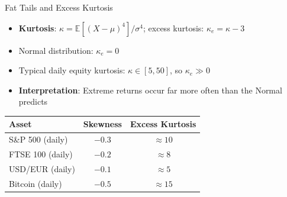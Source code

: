 \documentclass[9pt, aspectratio=169, t]{beamer}
\theoremstyle{definition}
\newcommand{\E}{\mathbb{E}}
\begin{document}
\begin{frame}{Fat Tails and Excess Kurtosis}
\begin{itemize}
\item \textbf{Kurtosis}: $\kappa = \E[(X-\mu)^4]/\sigma^4$; \quad excess kurtosis: $\kappa_e = \kappa - 3$
\item Normal distribution: $\kappa_e = 0$
\item Typical daily equity kurtosis: $\kappa \in [5, 50]$, so $\kappa_e \gg 0$
\item \textbf{Interpretation}: Extreme returns occur far more often than the Normal predicts
\end{itemize}

\vspace{0.2cm}
\begin{center}
\renewcommand{\arraystretch}{1.1}
\begin{tabular}{lcc}
\toprule
\textbf{Asset} & \textbf{Skewness} & \textbf{Excess Kurtosis} \\
\midrule
S\&P 500 (daily) & $-0.3$ & $\approx 10$ \\
FTSE 100 (daily) & $-0.2$ & $\approx 8$ \\
USD/EUR (daily) & $-0.1$ & $\approx 5$ \\
Bitcoin (daily) & $-0.5$ & $\approx 15$ \\
\bottomrule
\end{tabular}
\end{center}
\end{frame}
\end{document}
